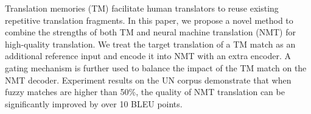 Translation memories (TM) facilitate human translators to reuse existing repetitive translation fragments. In this paper, we propose a novel method to combine the strengths of both TM and neural machine translation (NMT) for high-quality translation. We treat the target translation of a TM match as an additional reference input and encode it into NMT with an extra encoder. A gating mechanism is further used to balance the impact of the TM match on the NMT decoder. Experiment results on the UN corpus demonstrate that when fuzzy matches are higher than 50\%, the quality of NMT translation can be significantly improved by over 10 BLEU points.

